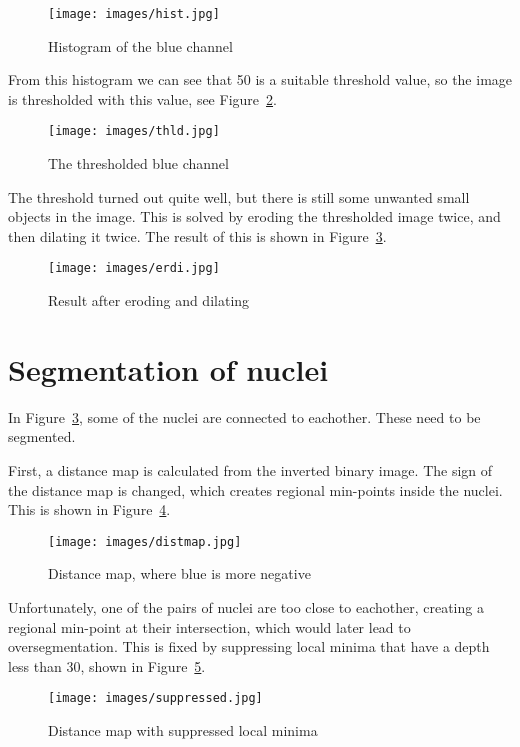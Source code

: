 \documentclass[twocolumn]{article}
\begin{document}
\begin{figure}[h!]
    \centering
    \texttt{[image: images/hist.jpg]}
    \caption{Histogram of the blue channel}
    \label{fig:hist}
\end{figure}

From this histogram we can see that 50 is a suitable threshold value, so the image
is thresholded with this value, see Figure~\ref{fig:thld}.

\begin{figure}[h!]
    \centering
    \texttt{[image: images/thld.jpg]}
    \caption{The thresholded blue channel}
    \label{fig:thld}
\end{figure}

The threshold turned out quite well, but there is still some unwanted small objects
in the image. This is solved by eroding the thresholded image twice, and then
dilating it twice. The result of this is shown in Figure~\ref{fig:erdi}.

\begin{figure}[h!]
    \centering
    \texttt{[image: images/erdi.jpg]}
    \caption{Result after eroding and dilating}
    \label{fig:erdi}
\end{figure}

\section{Segmentation of nuclei}

In Figure~\ref{fig:erdi}, some of the nuclei are connected to eachother. These
need to be segmented.

First, a distance map is calculated from the inverted binary image. The sign of
the distance map is changed, which creates regional min-points inside the
nuclei. This is shown in Figure~\ref{fig:distmap}.

\begin{figure}[h!]
    \centering
    \texttt{[image: images/distmap.jpg]}
    \caption{Distance map, where blue is more negative}
    \label{fig:distmap}
\end{figure}

Unfortunately, one of the pairs of nuclei are too close to eachother, creating
a regional min-point at their intersection, which would later lead to
oversegmentation. This is fixed by suppressing local minima that have a depth
less than 30, shown in Figure~\ref{fig:suppressed}.

\begin{figure}[h!]
    \centering
    \texttt{[image: images/suppressed.jpg]}
    \caption{Distance map with suppressed local minima}
    \label{fig:suppressed}
\end{figure}
\end{document}
